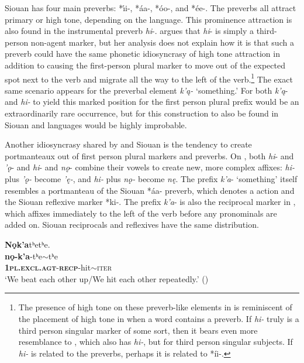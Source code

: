 \documentclass[output=paper]{LSP/langsci}
\begin{document}
Siouan has four main preverbs: *\'\i i-, *\'aa-, *\'oo-, and *\'ee-. The preverbs all attract primary  or high tone, depending on the language. This prominence attraction is also found in the  instrumental preverb \emph{hi}-. \citet{Linn2000} argues that \emph{hi}- is simply a third-person non-agent marker, but her analysis does not explain how it is that such a preverb could have the same phonetic idiosyncrasy of high tone attraction in addition to causing the first-person plural marker to move out of the expected spot next to the verb and migrate all the way to the left of the verb.\footnote{The presence of high tone on these preverb-like elements in  is reminiscent of the placement of high tone in  when a word contains a preverb. If \emph{hi-} truly is a third person singular marker of some sort, then it bears even more resemblance to , which also has \emph{hi-}, but for third person singular subjects. If \emph{hi-} is related to the  preverbs, perhaps it is related to *\'ii-.} 
The exact same scenario appears for the preverbal element \emph{k'\k{a}-} `something.' For both \emph{k'\k{a}}- and \emph{hi-} to yield this marked position for the first person plural prefix would be an extraordinarily rare occurrence, but for this construction to also be found in Siouan and  languages would be highly improbable.

Another idiosyncrasy shared by  and Siouan is the tendency to create portmanteaux out of first person plural markers and preverbs. On , both \emph{hi}- and \emph{'\k{o}}- and \emph{hi}- and \emph{n\k{o}}- combine their vowels to create new, more complex affixes: \emph{hi-} plus \emph{'\k{o}-} become \emph{'\k{e}-}, and \emph{hi-} plus \emph{n\k{o}-} become \emph{n\k{e}}. The prefix \emph{k'a}- `something' itself resembles a portmanteau of the Siouan *\'aa- preverb, which denotes a  action and the Siouan reflexive marker *ki-. The prefix \emph{k'a}- is also the reciprocal marker in , which affixes immediately to the left of the verb before any pronominals are added on. Siouan reciprocals and reflexives have the same distribution.

\ea \label{yuchimandan}
	\ea
	\glll  \textbf{N\k{o}k'a}tʰetʰe.\\ 
	\textbf{n\k{o}-k'a}-tʰe$\sim$tʰe\\
			\textbf{\textsc{1pl.excl.agt}}-\textbf{\textsc{recp}}-hit$\sim$\textsc{iter}\\ 
	\glt `We beat each other up/We hit each other repeatedly.' (\citealt[250]{Linn2000})
	
\end{document}
